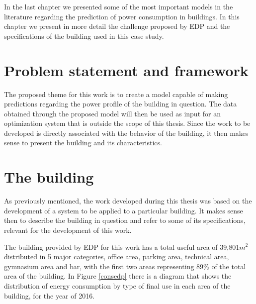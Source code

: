 \cleardoublepage
\label{chap:architecture}


In the last chapter we presented some of the most important models in the literature regarding the prediction of power consumption in buildings. In this chapter we present in more detail the challenge proposed by \ac{EDP} and the specifications of the building used in this case study.

\section{Problem statement and framework}

The proposed theme for this work is to create a model capable of making predictions regarding the power profile of the building in question. The data obtained through the proposed model will then be used as input for an optimization system that is outside the scope of this thesis. Since the work to be developed is directly associated with the behavior of the building, it then makes sense to present the building and its characteristics.



\section{The building}\label{subbuild}

As previously mentioned, the work developed during this thesis was based on the development of a system to be applied to a particular building. It makes sense then to describe the building in question and refer to some of its specifications, relevant for the development of this work.

The building provided by \ac{EDP} for this work has a total useful area of 39,801$m^2$ distributed in 5 major categories, office area, parking area, technical area, gymnasium area and bar, with the first two areas representing 89\% of the total area of the building. In Figure \ref{consedp} there is a diagram that shows the distribution of energy consumption by type of final use in each area of the building, for the year of 2016.

